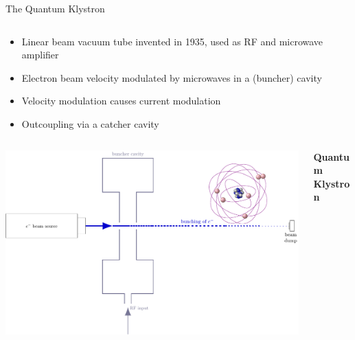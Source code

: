 \documentclass[final]{beamer}
\begin{document}
\begin{frame}[fragile]{}
\begin{columns}[T]
\begin{column}{.49\linewidth}
\begin{block}{\Large The Quantum Klystron}
\begin{columns}
\begin{column}{0.6\columnwidth}
            \begin{itemize}
              \item Linear beam vacuum tube invented in 1935, used as RF and microwave amplifier
              \item Electron beam velocity modulated by microwaves in a (buncher) cavity
              \item Velocity modulation causes current modulation
              \item Outcoupling via a catcher cavity
            \end{itemize}
          \end{column}
        \end{columns}
        \begin{columns}
          \begin{column}{0.4\columnwidth}
            \includegraphics[width=\columnwidth]{figures/qklystron.pdf}
          \end{column}
          \begin{column}{0.6\columnwidth}
            \begin{center}
              {\large \textbf{Quantum Klystron}}
            \end{center}


\end{column}
\end{columns}
\end{block}
\end{column}
\end{columns}
\end{frame}
\end{document}
